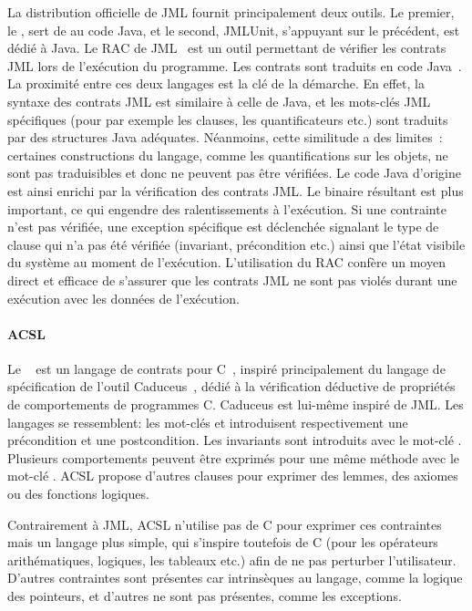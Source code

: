 La distribution officielle de JML fournit principalement deux outils.  Le
premier, le , sert de
 au code Java, et le second, JMLUnit, s'appuyant sur le
précédent, est dédié à Java. Le RAC de JML~ est un outil
permettant de vérifier les contrats JML lors de l'exécution du programme. Les
contrats sont traduits en code Java~. La proximité entre ces
deux langages est la clé de la démarche. En effet, la syntaxe des contrats JML
est similaire à celle de Java, et les mots-clés JML spécifiques (pour par
exemple les clauses, les quantificateurs etc.) sont traduits par des structures
Java adéquates. Néanmoins, cette similitude a des limites~: certaines
constructions du langage, comme les quantifications sur les objets, ne sont pas
traduisibles et donc ne peuvent pas être vérifiées. Le code Java d'origine est
ainsi enrichi par la vérification des contrats JML. Le binaire résultant est
plus important, ce qui engendre des ralentissements à l'exécution. Si une
contrainte n'est pas vérifiée, une exception spécifique est déclenchée signalant
le type de clause qui n'a pas été vérifiée (invariant, précondition etc.) ainsi
que l'état visibile du système au moment de l'exécution.
L'utilisation du RAC confère un moyen direct et efficace de s'assurer que les
contrats JML ne sont pas violés durant une exécution avec les données de
l'exécution.

\paragraph{ACSL} Le ~ est
un langage de contrats pour C~, inspiré principalement du langage de
spécification de l'outil Caduceus~, dédié à la vérification
déductive de propriétés de comportements de programmes C. Caduceus est lui-même
inspiré de JML. Les langages se ressemblent: les mot-clés  et
 introduisent respectivement une précondition et une
postcondition. Les invariants sont introduits avec le mot-clé .
Plusieurs comportements peuvent être exprimés pour une même méthode avec le
mot-clé . ACSL propose d'autres clauses pour exprimer des
lemmes, des axiomes ou des fonctions logiques.

Contrairement à JML, ACSL n'utilise pas de C pour exprimer ces contraintes mais
un langage plus simple, qui s'inspire toutefois de C (pour les opérateurs
arithématiques, logiques, les tableaux etc.) afin de ne pas perturber
l'utilisateur. D'autres contraintes sont présentes car intrinsèques au langage,
comme la logique des pointeurs, et d'autres ne sont pas présentes, comme les
exceptions.

